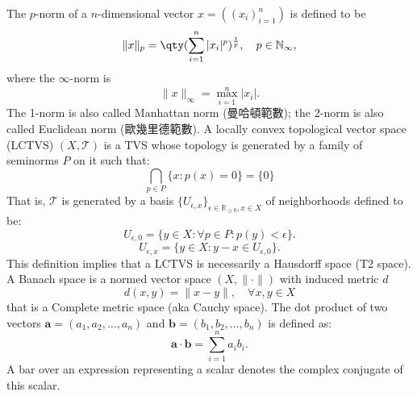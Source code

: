 \documentclass[a4paper,12pt]{report}
\begin{document}
The $p$-norm of a $n$-dimensional vector $x=((x_i)_{i=1}^n)$ is defined to be
\[\|x\|_p=\qty(\sum_{i=1}^n|x_i|^p)^{\frac{1}{p}},\quad p\in\mathbb{N}_{\infty},\]
where the $\infty$-norm is
\[\|x\|_{\infty}=\max_{i=1}^n|x_i|.\]
The 1-norm is also called Manhattan norm (曼哈頓範數); the 2-norm is also called Euclidean norm (歐幾里德範數).
A locally convex topological vector space (LCTVS) $(X,\mathcal{T})$ is a TVS whose topology is generated by a family of seminorms $P$ on it such that:
\[\bigcap_{p\in P}\{x\colon p(x)=0\}=\{0\}\]
That is, $\mathcal{T}$ is generated by a basis $\{U_{\epsilon,x}\}_{\epsilon\in\mathbb{R}_{\geq 0},x\in X}$ of neighborhoods defined to be:
\[U_{\epsilon,0}=\{y\in X\colon \forall p\in P\colon p(y)<\epsilon\}.\]
\[U_{\epsilon,x}=\{y\in X\colon y-x\in U_{\epsilon,0}\}.\]
This definition implies that a LCTVS is necessarily a Hausdorff space (T2 space).
A Banach space is a normed vector space $(X,\|{\cdot }\|)$ with induced metric $d$
\[d(x,y)=\|x-y\|,\quad \forall x,y\in X\]
that is a Complete metric space (aka Cauchy space).
The dot product of two vectors $\mathbf{a}=(a_1,a_2,\dots,a_n)$ and $\mathbf{b}=(b_1,b_2,\dots,b_n)$ is defined as:
\[\mathbf{a}\cdot\mathbf{b}=\sum_{i=1}^n a_ib_i.\]
A bar over an expression representing a scalar denotes the complex conjugate of this scalar.
\end{document}
